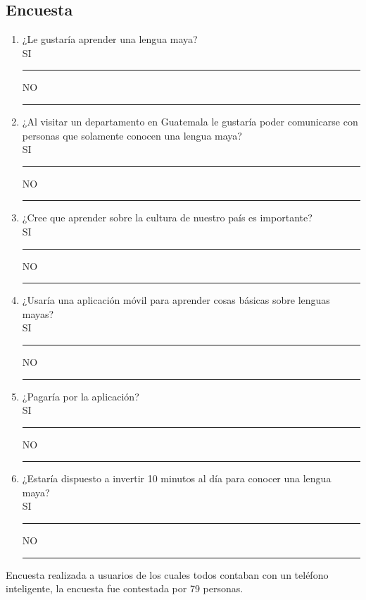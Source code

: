 \documentclass[a4paper,openright,11pt]{article}
\begin{document}
\subsection{Encuesta}
\begin{enumerate}
	\item ¿Le gustaría aprender una lengua maya?\\
	SI \rule{10mm}{0.1mm}  \hspace{5cm} NO \rule{10mm}{0.1mm}
	\item ¿Al visitar un departamento en Guatemala le gustaría poder comunicarse con personas que solamente conocen una lengua maya?	\\
	SI \rule{10mm}{0.1mm}  \hspace{5cm} NO \rule{10mm}{0.1mm}
	\item ¿Cree que aprender sobre la cultura de nuestro país es importante?\\
	SI \rule{10mm}{0.1mm}  \hspace{5cm} NO \rule{10mm}{0.1mm}
	\item ¿Usaría una aplicación móvil para aprender cosas básicas sobre lenguas mayas?\\
	SI \rule{10mm}{0.1mm}  \hspace{5cm} NO \rule{10mm}{0.1mm}
	\item ¿Pagaría por la aplicación?\\
	SI \rule{10mm}{0.1mm}  \hspace{5cm} NO \rule{10mm}{0.1mm}
	\item ¿Estaría dispuesto a invertir 10 minutos al día para conocer una lengua maya?\\
	SI \rule{10mm}{0.1mm}  \hspace{5cm} NO \rule{10mm}{0.1mm}
\end{enumerate}
Encuesta realizada a usuarios de los cuales todos contaban con un teléfono inteligente, la encuesta fue contestada por 79 personas.
\newpage
\end{document}
